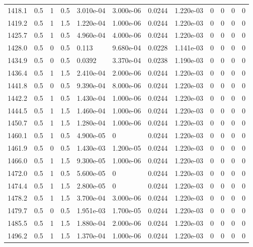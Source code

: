 \documentclass[preview]{standalone}
\begin{document}
{{{{{{{{{\begin{tabular}{L{1.2cm}C{1.2cm} C{0.3cm}C{0.5cm} C{1.4cm}C{1.4cm} C{1.4cm}C{1.4cm} C{1.6cm}C{1.6cm} C{1.6cm}C{1.6cm}}
  1418.1  &   0.5  & 1     & 0.5 &  3.010e-04  & 3.000e-06  &  0.0244&   1.220e-03& 0 & 0   &  0 & 0  \\ 
  1419.2  &   0.5  & 1     & 1.5 &  1.220e-04  & 1.000e-06  &  0.0244&   1.220e-03& 0 & 0   &  0 & 0  \\ 
  1425.7  &   0.5  & 1     & 0.5 &  4.960e-04  & 4.000e-06  &  0.0244&   1.220e-03& 0 & 0   &  0 & 0  \\ 
  1428.0  &   0.5  & 0     & 0.5 &  0.113  & 9.680e-04  &  0.0228&   1.141e-03& 0 & 0   &  0 & 0  \\ 
  1434.9  &   0.5  & 0     & 0.5 &  0.0392  & 3.370e-04  &  0.0238&   1.190e-03& 0 & 0   &  0 & 0  \\ 
  1436.4  &   0.5  & 1     & 1.5 &  2.410e-04  & 2.000e-06  &  0.0244&   1.220e-03& 0 & 0   &  0 & 0  \\ 
  1441.8  &   0.5  & 0     & 0.5 &  9.390e-04  & 8.000e-06  &  0.0244&   1.220e-03& 0 & 0   &  0 & 0  \\ 
  1442.2  &   0.5  & 1     & 0.5 &  1.430e-04  & 1.000e-06  &  0.0244&   1.220e-03& 0 & 0   &  0 & 0  \\ 
  1444.5  &   0.5  & 1     & 1.5 &  1.460e-04  & 1.000e-06  &  0.0244&   1.220e-03& 0 & 0   &  0 & 0  \\ 
  1450.7  &   0.5  & 1     & 1.5 &  1.280e-04  & 1.000e-06  &  0.0244&   1.220e-03& 0 & 0   &  0 & 0  \\ 
  1460.1  &   0.5  & 1     & 0.5 &  4.900e-05  & 0  &  0.0244&   1.220e-03& 0 & 0   &  0 & 0  \\ 
  1461.9  &   0.5  & 0     & 0.5 &  1.430e-03  & 1.200e-05  &  0.0244&   1.220e-03& 0 & 0   &  0 & 0  \\ 
  1466.0  &   0.5  & 1     & 1.5 &  9.300e-05  & 1.000e-06  &  0.0244&   1.220e-03& 0 & 0   &  0 & 0  \\ 
  1472.0  &   0.5  & 1     & 0.5 &  5.600e-05  & 0  &  0.0244&   1.220e-03& 0 & 0   &  0 & 0  \\ 
  1474.4  &   0.5  & 1     & 1.5 &  2.800e-05  & 0  &  0.0244&   1.220e-03& 0 & 0   &  0 & 0  \\ 
  1478.2  &   0.5  & 1     & 1.5 &  3.700e-04  & 3.000e-06  &  0.0244&   1.220e-03& 0 & 0   &  0 & 0  \\ 
  1479.7  &   0.5  & 0     & 0.5 &  1.951e-03  & 1.700e-05  &  0.0244&   1.220e-03& 0 & 0   &  0 & 0  \\ 
  1485.5  &   0.5  & 1     & 1.5 &  1.880e-04  & 2.000e-06  &  0.0244&   1.220e-03& 0 & 0   &  0 & 0  \\ 
  1496.2  &   0.5  & 1     & 1.5 &  1.370e-04  & 1.000e-06  &  0.0244&   1.220e-03& 0 & 0   &  0 & 0  \\ 

\end{tabular}}}}}}}}}}
\end{document}
